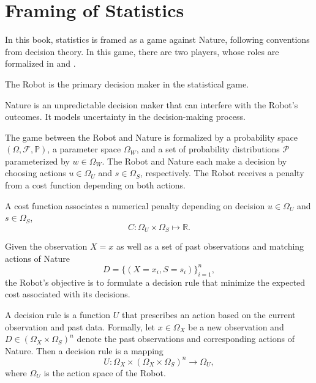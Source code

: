 \section{Framing of Statistics}
\label{sec:framing_statistics}
In this book, statistics is framed as a game against Nature, following conventions from decision theory\cite{lavalle2006planning}. In this game, there are two players, whose roles are formalized in  and .

\begin{definition}[Robot]
	\label{def:robot}
	The Robot is the primary decision maker in the statistical game.
\end{definition}

\begin{definition}[Nature]
	\label{def:nature}	
	Nature is an unpredictable decision maker that can interfere with the Robot's outcomes. It models uncertainty in the decision-making process.
\end{definition}

\begin{remark}
	The game between the Robot and Nature is formalized by a probability space $(\Omega, \mathcal{F}, \mathbb{P})$, a parameter space $\Omega_W$, and a set of probability distributions $\mathcal{P}$ parameterized by $w\in \Omega_W$. The Robot and Nature each make a decision by choosing actions $u \in \Omega_U$ and $s \in \Omega_S$, respectively. The Robot receives a penalty from a cost function depending on both actions.
\end{remark}

\begin{definition}
	\label{def:cost_function}
	A cost function associates a numerical penalty depending on decision $u \in \Omega_U$ and $s \in \Omega_S$,
	\begin{equation}
		C: \Omega_U \times \Omega_S \mapsto \mathbb{R}.
	\end{equation}
\end{definition}
Given the observation $X=x$ as well as a set of past observations and matching actions of Nature
\begin{equation}
	D=\{(X = x_i,S= s_i)\}_{i=1}^n,
\end{equation}
the Robot's objective is to formulate a decision rule that minimize the expected cost associated with its decisions\cite{murphy2023probabilistic}.
\begin{definition}
	\label{def:decision_rule}
	A decision rule is a function $U$ that prescribes an action based on the current observation and past data. Formally, let $x \in \Omega_X$ be a new observation and $D \in (\Omega_X \times \Omega_S)^n$ denote the past observations and corresponding actions of Nature. Then a decision rule is a mapping
	\begin{equation}
		U: \Omega_X \times (\Omega_X \times \Omega_S)^n \to \Omega_U,
	\end{equation}
	where $\Omega_U$ is the action space of the Robot.
\end{definition}

